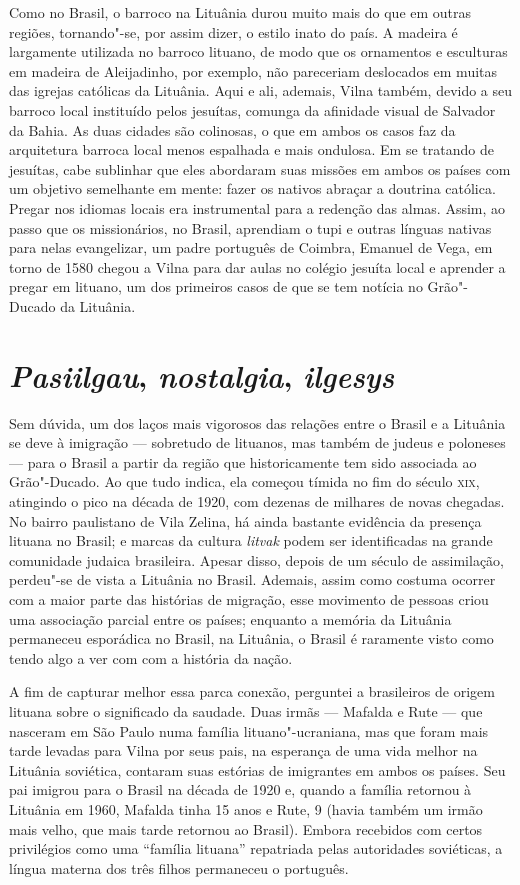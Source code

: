 Como no Brasil, o barroco na Lituânia durou muito mais do que em outras
regiões, tornando"-se, por assim dizer, o estilo inato do país. A madeira
é largamente utilizada no barroco lituano, de modo que os ornamentos e
esculturas em madeira de Aleijadinho, por exemplo, não pareceriam
deslocados em muitas das igrejas católicas da Lituânia. Aqui e ali,
ademais, Vilna também, devido a seu barroco local instituído pelos
jesuítas, comunga da afinidade visual de Salvador da Bahia. As duas
cidades são colinosas, o que em ambos os casos faz da arquitetura
barroca local menos espalhada e mais ondulosa. Em se tratando de
jesuítas, cabe sublinhar que eles abordaram suas missões em ambos os
países com um objetivo semelhante em mente: fazer os nativos abraçar a
doutrina católica. Pregar nos idiomas locais era instrumental para a
redenção das almas. Assim, ao passo que os missionários, no Brasil,
aprendiam o tupi e outras línguas nativas para nelas evangelizar, um
padre português de Coimbra, Emanuel de Vega, em torno de 1580 chegou a
Vilna para dar aulas no colégio jesuíta local e aprender a pregar em
lituano, um dos primeiros casos de que se tem notícia no Grão"-Ducado da
Lituânia.

\section*{\textit{Pasiilgau}, \textit{nostalgia}, \textit{ilgesys}}

Sem dúvida, um dos laços mais vigorosos das relações entre o Brasil e a
Lituânia se deve à imigração --- sobretudo de lituanos, mas também de
judeus e poloneses --- para o Brasil a partir da região que historicamente
tem sido associada ao Grão"-Ducado. Ao que tudo indica, ela começou
tímida no fim do século \textsc{xix}, atingindo o pico na década de 1920,
com dezenas de milhares de novas chegadas. No bairro paulistano de Vila
Zelina, há ainda bastante evidência da presença lituana no Brasil; e
marcas da cultura \textit{litvak} podem ser identificadas na grande comunidade
judaica brasileira. Apesar disso, depois de um século de assimilação,
perdeu"-se de vista a Lituânia no Brasil. Ademais, assim como costuma
ocorrer com a maior parte das histórias de migração, esse movimento de
pessoas criou uma associação parcial entre os países; enquanto a memória
da Lituânia permaneceu esporádica no Brasil, na Lituânia, o Brasil é
raramente visto como tendo algo a ver com com a história da nação.

A fim de capturar melhor essa parca conexão, perguntei a brasileiros de
origem lituana sobre o significado da saudade. Duas irmãs --- Mafalda e
Rute --- que nasceram em São Paulo numa família lituano"-ucraniana, mas que
foram mais tarde levadas para Vilna por seus pais, na esperança de uma
vida melhor na Lituânia soviética, contaram suas estórias de imigrantes
em ambos os países. Seu pai imigrou para o Brasil na década de 1920 e,
quando a família retornou à Lituânia em 1960, Mafalda tinha 15 anos e
Rute, 9 (havia também um irmão mais velho, que mais tarde retornou ao
Brasil). Embora recebidos com certos privilégios como uma ``família
lituana'' repatriada pelas autoridades soviéticas, a língua materna dos
três filhos permaneceu o português. 

